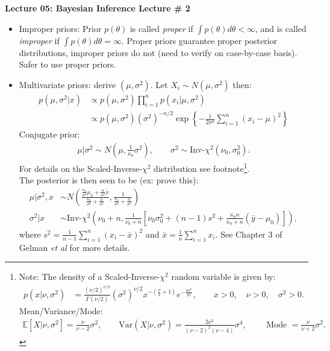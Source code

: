\documentclass[11pt]{article}
\begin{document}
\textbf{Lecture 05: Bayesian Inference Lecture \# 2}

\begin{itemize}

\item Improper priors: Prior $p(\theta)$ is called \emph{proper} if $\int{}p(\theta)d\theta<\infty$, and is called \emph{improper} if $\int{}p(\theta)d\theta=\infty$. Proper priors guarantee proper posterior distributions, improper priors do not (need to verify on case-by-case basis). Safer to use proper priors.

\item Multivariate priors: derive $(\mu,\sigma^{2})$. Let $X_{i}\sim{}N(\mu,\sigma^{2})$ then:
\begin{align*}
 p(\mu,\sigma^{2}|x) &\propto p(\mu,\sigma^{2})\prod_{i=1}^{n}p(x_{i}|\mu,\sigma^{2}) \\
  &\propto p(\mu,\sigma^{2})(\sigma^{2})^{-n/2}\exp\left\{-\frac{1}{2\sigma^{2}}\sum_{i=1}^{n}(x_{i}-\mu)^{2}\right\}
\end{align*}
Conjugate prior:
\begin{align*}
 \mu | \sigma^{2} \sim N\left(\mu,\frac{1}{\kappa_{0}}\sigma^{2}\right) , \qquad \sigma^{2} \sim \textrm{Inv-}\chi^{2}(\nu_{0},\sigma_{0}^{2}) . 
\end{align*}
For details on the Scaled-Inverse-$\chi^{2}$ distribution see footnote\footnote{Note: The density of a Scaled-Inverse-$\chi^{2}$ random variable is given by:
\begin{align}
 p(x|\nu,\sigma^{2}) &= \frac{(\nu/2)^{\nu/2}}{\Gamma(\nu/2)}(\sigma^{2})^{\nu/2}x^{-(\frac{\nu}{2}+1)}e^{-\frac{\nu\sigma^{2}}{2x}} , \qquad x>0, \quad \nu>0, \quad \sigma^{2}>0 .
\end{align}
Mean/Variance/Mode:
\begin{align*}
 \mathbb{E}\left[X|\nu,\sigma^{2}\right] = \frac{\nu}{\nu-2}\sigma^{2} , \qquad \textrm{Var}\left(X|\nu,\sigma^{2}\right) = \frac{2\nu^{2}}{(\nu-2)^{2}(\nu-4)}\sigma^{4} , \qquad \textrm{ Mode } = \frac{\nu}{\nu+2}\sigma^{2} . 
\end{align*}
}.\\ The posterior is then seen to be (ex: prove this):
\begin{align*}
 \mu | \sigma^{2},x &\sim N\left(\frac{\frac{\kappa_{0}}{\sigma^{2}}\mu_{0} + \frac{n}{\sigma^{2}}\bar{x}}{\frac{\kappa_{0}}{\sigma^{2}}+\frac{n}{\sigma^{2}}},\frac{1}{\frac{\kappa_{0}}{\sigma^{2}}+\frac{n}{\sigma^{2}}}\right) \\
 \sigma^{2} | x &\sim \textrm{Inv-}\chi^{2}\left(\nu_{0}+n,\frac{1}{\nu_{0}+n}\left[\nu_{0}\sigma^{2}_{0}+(n-1)s^{2}+\frac{\kappa_{0}n}{\kappa_{0}+n}(\bar{y}-\mu_{0})\right]\right) ,
\end{align*}
where $s^{2}=\frac{1}{n-1}\sum_{i=1}^{n}(x_{i}-\bar{x})^{2}$ and $\bar{x}=\frac{1}{n}\sum_{i=1}^{n}x_{i}$. See Chapter 3 of Gelman \emph{et al} for more details.


\end{itemize}
\end{document}
